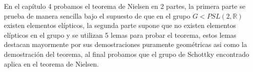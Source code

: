 \begin{resumen}
En el cap\'itulo 4 probamos el teorema de Nielsen en 2 partes, la primera parte se prueba de manera sencilla bajo el supuesto de que en el grupo $G<PSL(2,\mathbb{R})$ existen elementos el\'ipticos, la segunda parte supone que no existen elementos el\'ipticos en el grupo y se utilizan 5 lemas para probar el teorema, estos lemas destacan mayormente por sus demostraciones puramente geom\'etricas asi como la demostraci\'on del teorema, al final probamos que el grupo de Schottky encontrado aplica en el teorema de Nielsen.      



\end{resumen}





